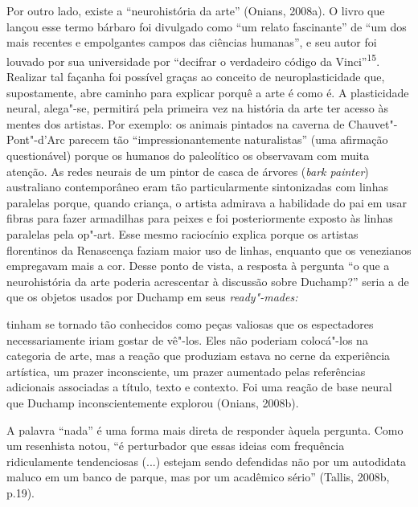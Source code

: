 Por outro lado, existe a ``neurohistória da arte'' (Onians, 2008a). O
livro que lançou esse termo bárbaro foi divulgado como ``um relato
fascinante'' de ``um dos mais recentes e empolgantes campos das ciências
humanas'', e seu autor foi louvado por sua universidade por ``decifrar o
verdadeiro código da Vinci''\textsuperscript{15}. Realizar tal façanha
foi possível graças ao conceito de neuroplasticidade que, supostamente,
abre caminho para explicar porquê a arte é como é. A plasticidade
neural, alega"-se, permitirá pela primeira vez na história da arte ter
acesso às mentes dos artistas. Por exemplo: os animais pintados na
caverna de Chauvet"-Pont"-d'Arc parecem tão ``impressionantemente
naturalistas'' (uma afirmação questionável) porque os humanos do
paleolítico os observavam com muita atenção. As redes neurais de um
pintor de casca de árvores (\emph{bark painter}) australiano
contemporâneo eram tão particularmente sintonizadas com linhas paralelas
porque, quando criança, o artista admirava a habilidade do pai em usar
fibras para fazer armadilhas para peixes e foi posteriormente exposto às
linhas paralelas pela op"-art. Esse mesmo raciocínio explica porque os
artistas florentinos da Renascença faziam maior uso de linhas, enquanto
que os venezianos empregavam mais a cor. Desse ponto de vista, a
resposta à pergunta ``o que a neurohistória da arte poderia acrescentar
à discussão sobre Duchamp?'' seria a de que os objetos usados por
Duchamp em seus \emph{ready"-mades:}

tinham se tornado tão conhecidos como peças valiosas que os espectadores
necessariamente iriam gostar de vê"-los. Eles não poderiam colocá"-los na
categoria de arte, mas a reação que produziam estava no cerne da
experiência artística, um prazer inconsciente, um prazer aumentado pelas
referências adicionais associadas a título, texto e contexto. Foi uma
reação de base neural que Duchamp inconscientemente explorou (Onians,
2008b).

A palavra ``nada'' é uma forma mais direta de responder àquela pergunta.
Como um resenhista notou, ``é perturbador que essas ideias com
frequência ridiculamente tendenciosas (...) estejam sendo defendidas não
por um autodidata maluco em um banco de parque, mas por um acadêmico
sério'' (Tallis, 2008b, p.19).

